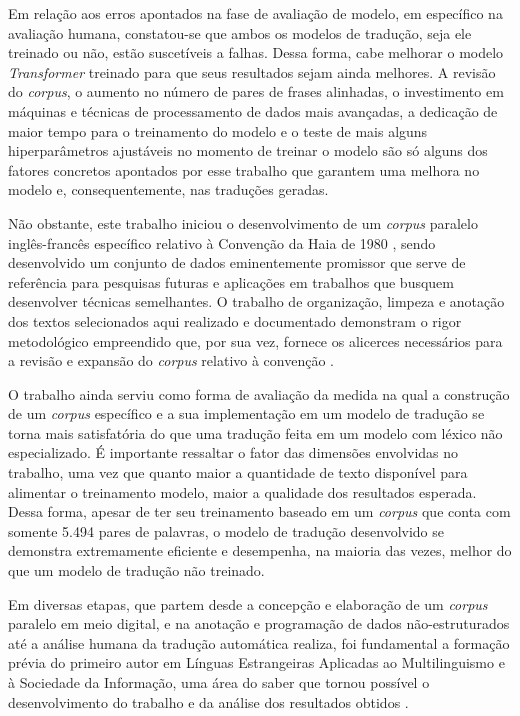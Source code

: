 \documentclass[portuguese]{textolivre}
\begin{document}
Em relação aos erros apontados na fase de avaliação de modelo, em específico na avaliação humana, constatou-se que ambos os modelos de tradução, seja ele treinado ou não, estão suscetíveis a falhas. Dessa forma, cabe melhorar o modelo \textit{Transformer} treinado para que seus resultados sejam ainda melhores. A revisão do \textit{corpus}, o aumento no número de pares de frases alinhadas, o investimento em máquinas e técnicas de processamento de dados mais avançadas, a dedicação de maior tempo para o treinamento do modelo e o teste de mais alguns hiperparâmetros ajustáveis no momento de treinar o modelo são só alguns dos fatores concretos apontados por esse trabalho que garantem uma melhora no modelo e, consequentemente, nas traduções geradas.

Não obstante, este trabalho iniciou o desenvolvimento de um \textit{corpus} paralelo inglês-francês específico relativo à Convenção da Haia de 1980 \cite{hcch_convention_1980}, sendo desenvolvido um conjunto de dados eminentemente promissor que serve de referência para pesquisas futuras e aplicações em trabalhos que busquem desenvolver técnicas semelhantes. O trabalho de organização, limpeza e anotação dos textos selecionados aqui realizado e documentado demonstram o rigor metodológico empreendido que, por sua vez, fornece os alicerces necessários para a revisão e expansão do \textit{corpus} relativo à convenção \cite{hcch_convention_1980}.

O trabalho ainda serviu como forma de avaliação da medida na qual a construção de um \textit{corpus} específico e a sua implementação em um modelo de tradução se torna mais satisfatória do que uma tradução feita em um modelo com léxico não especializado. É importante ressaltar o fator das dimensões envolvidas no trabalho, uma vez que quanto maior a quantidade de texto disponível para alimentar o treinamento modelo, maior a qualidade dos resultados esperada. Dessa forma, apesar de ter seu treinamento baseado em um \textit{corpus} que conta com somente 5.494 pares de palavras, o modelo de tradução desenvolvido se demonstra extremamente eficiente e desempenha, na maioria das vezes, melhor do que um modelo de tradução não treinado.

Em diversas etapas, que partem desde a concepção e elaboração de um \textit{corpus} paralelo em meio digital, e na anotação e programação de dados não-estruturados até a análise humana da tradução automática realiza, foi fundamental a formação prévia do primeiro autor em Línguas Estrangeiras Aplicadas ao Multilinguismo e à Sociedade da Informação, uma área do saber que tornou possível o desenvolvimento do trabalho e da análise dos resultados obtidos \cite{pires_avaliacao_2020}.
\end{document}
